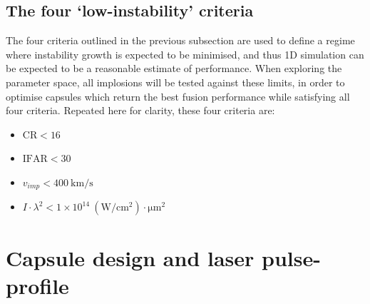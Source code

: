 \subsection{The four `low-instability' criteria}
The four criteria outlined in the previous subsection are used to define a regime where instability growth is expected to be minimised, and thus 1D simulation can be expected to be a reasonable estimate of performance. When exploring the parameter space, all implosions will be tested against these limits, in order to optimise capsules which return the best fusion performance while satisfying all four criteria. Repeated here for clarity, these four criteria are:
\begin{itemize}
    \item $\textrm{CR} < 16$
    \item $\textrm{IFAR} < 30$
    \item $v_{imp} < 400 \: \unit{\kilo\meter\per\second}$
    \item $I \cdot \lambda^2 < 1 \times 10^{14} \: (\unit{\watt\per\centi\meter\squared}) \cdot \unit{\micro\meter\squared}$
\end{itemize}



\section{Capsule design and laser pulse-profile} \label{sec: CapsuleAndPulse}

